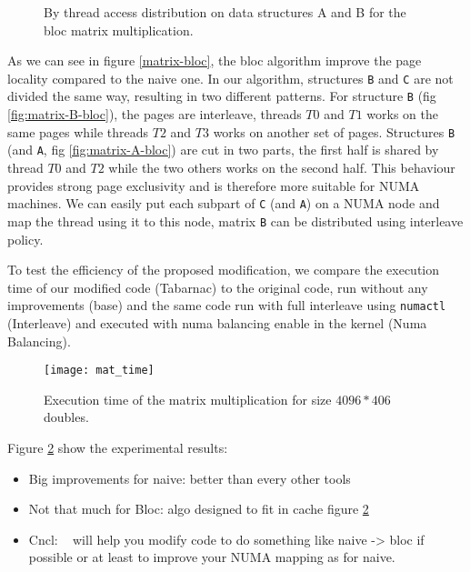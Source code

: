 \begin{figure}[htb]
    \centering
    \caption{By thread access distribution on data structures A and B for the
    bloc matrix multiplication.}
    \label{fig:matrix-bloc}
\end{figure}

As we can see in figure \ref{matrix-bloc}, the bloc algorithm improve the page
locality compared to the naive one. In our algorithm, structures \texttt{B}
and \texttt{C} are not divided the same way, resulting in two different
patterns. For structure \texttt{B} (fig \ref{fig:matrix-B-bloc}), the pages
are interleave, threads $T0$ and $T1$ works on the same pages while threads
$T2$ and $T3$ works on another set of pages. Structures \texttt{B} (and
\texttt{A}, fig \ref{fig:matrix-A-bloc}) are cut in two parts, the first half
is shared by thread $T0$ and $T2$ while the two others works on the second
half. This behaviour provides strong page exclusivity and is therefore more
suitable for NUMA machines. We can easily put each subpart of \texttt{C} (and
\texttt{A}) on a NUMA node and map the thread using it to this node, matrix
\texttt{B} can be distributed using interleave policy.

To test the efficiency of the proposed modification, we compare the execution
time of our modified code (Tabarnac) to the  original code, run without any
improvements (base) and the same code run with full interleave using
\texttt{numactl} (Interleave) and executed with numa balancing enable in the
kernel (Numa Balancing).

\begin{figure}[htb]
    \centering
    \texttt{[image: mat\_time]}
    \caption{Execution time of the matrix multiplication for size $4096*406$ doubles.}
    \label{fig:matrix-res}
\end{figure}

Figure \ref{fig:matrix-res} show the experimental results:

\begin{itemize}
    \item Big improvements for naive: better than every other tools
    \item Not that much for Bloc: algo designed to fit in cache figure
        \ref{fig:matrix-res}
    \item Cncl: \TABARNAC~ will help you modify code to do something like naive
        -> bloc if possible or at least to improve your NUMA mapping as for
        naive.
\end{itemize}


